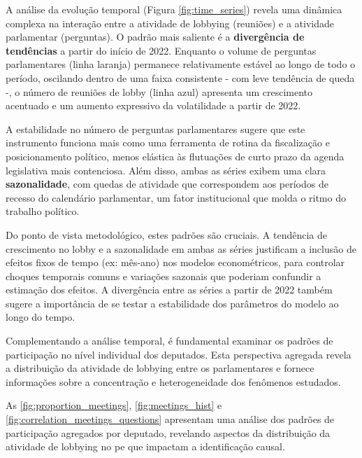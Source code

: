 A análise da evolução temporal (Figura \ref{fig:time_series}) revela uma dinâmica complexa na interação entre a atividade de lobbying (reuniões) e a atividade parlamentar (perguntas). O padrão mais saliente é a \textbf{divergência de tendências} a partir do início de 2022. Enquanto o volume de perguntas parlamentares (linha laranja) permanece relativamente estável ao longo de todo o período, oscilando dentro de uma faixa consistente - com leve tendência de queda -, o número de reuniões de lobby (linha azul) apresenta um crescimento acentuado e um aumento expressivo da volatilidade a partir de 2022.

A estabilidade no número de perguntas parlamentares sugere que este instrumento funciona mais como uma ferramenta de rotina da fiscalização e posicionamento político, menos elástica às flutuações de curto prazo da agenda legislativa mais contenciosa. Além disso, ambas as séries exibem uma clara \textbf{sazonalidade}, com quedas de atividade que correspondem aos períodos de recesso do calendário parlamentar, um fator institucional que molda o ritmo do trabalho político.

Do ponto de vista metodológico, estes padrões são cruciais. A tendência de crescimento no lobby e a sazonalidade em ambas as séries justificam a inclusão de efeitos fixos de tempo (ex: mês-ano) nos modelos econométricos, para controlar choques temporais comuns e variações sazonais que poderiam confundir a estimação dos efeitos. A divergência entre as séries a partir de 2022 também sugere a importância de se testar a estabilidade dos parâmetros do modelo ao longo do tempo.



Complementando a análise temporal, é fundamental examinar os padrões de participação no nível individual dos deputados. Esta perspectiva agregada revela a distribuição da atividade de lobbying entre os parlamentares e fornece informações sobre a concentração e heterogeneidade dos fenômenos estudados.



As \autoref{fig:proportion_meetings}, \autoref{fig:meetings_hist} e \autoref{fig:correlation_meetings_questions} apresentam uma análise dos padrões de participação agregados por deputado, revelando aspectos da distribuição da atividade de lobbying no \acrshort{pe} que impactam a identificação causal.


